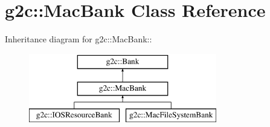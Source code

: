 \hypertarget{classg2c_1_1_mac_bank}{
\section{g2c::MacBank Class Reference}
\label{classg2c_1_1_mac_bank}
}
Inheritance diagram for g2c::MacBank::\begin{figure}[H]
\begin{center}
\leavevmode
\includegraphics[height=3cm]{classg2c_1_1_mac_bank}
\end{center}
\end{figure}
